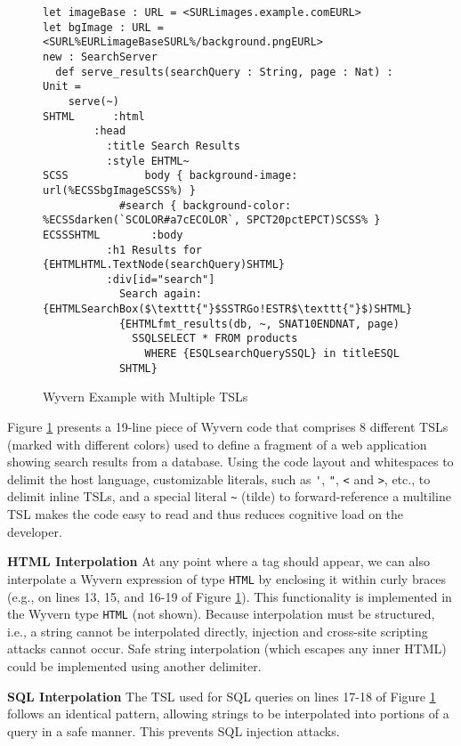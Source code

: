 \documentclass{sig-alternate}
\let\li\lstinline
\begin{document}
\begin{figure}[t]
\begin{lstlisting}
let imageBase : URL = <SURLimages.example.comEURL>
let bgImage : URL = <SURL%EURLimageBaseSURL%/background.pngEURL>
new : SearchServer
  def serve_results(searchQuery : String, page : Nat) : Unit =
    serve(~)
SHTML      :html
        :head
          :title Search Results
          :style EHTML~
SCSS            body { background-image: url(%ECSSbgImageSCSS%) }
            #search { background-color: %ECSSdarken(`SCOLOR#a7cECOLOR`, SPCT20pctEPCT)SCSS% }
ECSSSHTML        :body
          :h1 Results for {EHTMLHTML.TextNode(searchQuery)SHTML}
          :div[id="search"]
            Search again: {EHTMLSearchBox($\texttt{"}$SSTRGo!ESTR$\texttt{"}$)SHTML}
            {EHTMLfmt_results(db, ~, SNAT10ENDNAT, page)
              SSQLSELECT * FROM products
                WHERE {ESQLsearchQuerySSQL} in titleESQL
            SHTML}
\end{lstlisting}
\vspace{-1px}
\caption{Wyvern Example with Multiple TSLs}
\label{f-example}
\vspace{-10px}
\end{figure}

Figure \ref{f-example} presents a 19-line piece of Wyvern code that comprises 8 different TSLs (marked with different colors) used to define a fragment of a web application showing search results from a database. Using the code layout and whitespaces to delimit the host language, customizable literals, such as \li{'}, \li{"}, \li{<} and \li{>}, etc., to delimit inline TSLs, and a special literal \li{~} (tilde) to forward-reference a multiline TSL makes the code easy to read and thus reduces cognitive load on the developer.

\textbf{HTML Interpolation} At any point where a tag should appear, we can also interpolate a Wyvern expression of type \li{HTML} by enclosing it within curly braces (e.g., on lines 13, 15, and 16-19 of Figure \ref{f-example}). This functionality is implemented in the Wyvern type \li{HTML} (not shown). Because interpolation must be structured, i.e., a string cannot be interpolated directly, injection and cross-site scripting attacks cannot occur. Safe string interpolation (which escapes any inner HTML) could be implemented using another delimiter.

\textbf{SQL Interpolation} The TSL used for SQL queries on lines 17-18 of Figure \ref{f-example} follows an identical pattern, allowing strings to be interpolated into portions of a query in a safe manner. This prevents SQL injection attacks.
\end{document}
